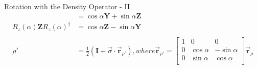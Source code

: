 \documentclass{beamer}
\begin{document}
\begin{frame}{Rotation with the Density Operator - II}
{\begin{align*}
            &=    \cos\alpha \mathbf{Y} + \sin\alpha \mathbf{Z} \\
      R_z(\alpha) \mathbf{Z} R_z(\alpha)^{\dagger}
            &=    \cos\alpha \mathbf{Z} - \sin\alpha \mathbf{Y} \\
      \\
      \rho' &= \frac{1}2 ( \mathbf{I} + \overrightarrow{\sigma} \cdot \overrightarrow{\mathbf{r}}_{\rho'} )
            , where \overrightarrow{\mathbf{r}}_{\rho'} =
              \begin{bmatrix}
                1 & 0          & 0 \\
                0 & \cos\alpha & -\sin\alpha \\
                0 & \sin\alpha & \cos\alpha \\
              \end{bmatrix}
              \overrightarrow{\mathbf{r}}_{\rho}
    \end{align*}
  }%
\end{frame}
\end{document}
